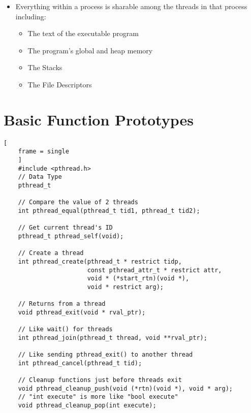 \documentclass{article}
\begin{document}
\begin{itemize}
\item Everything within a process is sharable among the threads in that process including:
    \begin{itemize}
        \item The text of the executable program
        \item The program's global and heap memory
        \item The Stacks
        \item The File Descriptors
    \end{itemize}
\end{itemize}

\section{Basic Function Prototypes}
\begin{lstlisting}[
    frame = single
    ]
    #include <pthread.h>
    // Data Type
    pthread_t

    // Compare the value of 2 threads
    int pthread_equal(pthread_t tid1, pthread_t tid2);

    // Get current thread's ID
    pthread_t pthread_self(void);

    // Create a thread
    int pthread_create(pthread_t * restrict tidp,
                       const pthread_attr_t * restrict attr,
                       void * (*start_rtn)(void *),
                       void * restrict arg);

    // Returns from a thread
    void pthread_exit(void * rval_ptr);

    // Like wait() for threads
    int pthread_join(pthread_t thread, void **rval_ptr);

    // Like sending pthread_exit() to another thread
    int pthread_cancel(pthread_t tid);

    // Cleanup functions just before threads exit
    void pthread_cleanup_push(void (*rtn)(void *), void * arg);
    // "int execute" is more like "bool execute"
    void pthread_cleanup_pop(int execute);
\end{lstlisting}

\newpage
\end{document}

